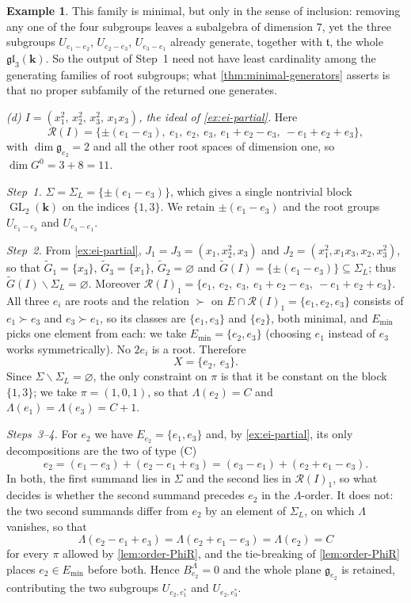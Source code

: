 \documentclass[11pt,letterpaper,reqno]{amsart}
\theoremstyle{remark}
\theoremstyle{definition}
\newtheorem{example}[example]{Example}
\newcommand{\KK}[0]{\ensuremath{\mathbf{k}}}
\newcommand{\GL}[0]{\ensuremath{\operatorname{GL}}}
\newcommand{\R}{\mathcal R}
\begin{document}
\begin{example}
This family is minimal, but only in the sense of inclusion: removing any one of the
four subgroups leaves a subalgebra of dimension $7$, yet the three subgroups
$U_{e_1-e_2}$, $U_{e_2-e_3}$, $U_{e_3-e_1}$ already generate, together with $\mathfrak t$, the whole
$\mathfrak{gl}_3(\KK)$. So the output of Step~1 need not have least cardinality among the
generating families of root subgroups; what \cref{thm:minimal-generators} asserts is that no
proper subfamily of the returned one generates.

\medskip\noindent\emph{(d) $I=(x_1^2,\,x_2^2,\,x_3^2,\,x_1x_3)$, the ideal of
\cref{ex:ei-partial}.} Here
\[\R(I)=\{\pm(e_1-e_3),\ e_1,\ e_2,\ e_3,\ e_1+e_2-e_3,\ -e_1+e_2+e_3\},\]
with $\dim\mathfrak g_{e_2}=2$ and all the other root spaces of dimension one, so
$\dim G^0=3+8=11$.

\emph{Step~1.} $\Sigma=\Sigma_L=\{\pm(e_1-e_3)\}$, which gives a single nontrivial block
$\GL_2(\KK)$ on the indices $\{1,3\}$. We retain $\pm(e_1-e_3)$ and the root groups
$U_{e_1-e_3}$ and $U_{e_3-e_1}$.

\emph{Step~2.} From \cref{ex:ei-partial}, $J_1=J_3=(x_1,x_2^2,x_3)$ and
$J_2=(x_1^2,x_1x_3,x_2,x_3^2)$, so that $\widetilde G_1=\{x_3\}$, $\widetilde G_3=\{x_1\}$,
$\widetilde G_2=\varnothing$ and $\widetilde G(I)=\{\pm(e_1-e_3)\}\subseteq\Sigma_L$; thus
$\widetilde G(I)\smallsetminus\Sigma_L=\varnothing$. Moreover
$\R(I)_1=\{e_1,\ e_2,\ e_3,\ e_1+e_2-e_3,\ -e_1+e_2+e_3\}$. All three $e_i$ are roots and the
relation $\succ$ on $E\cap\R(I)_1=\{e_1,e_2,e_3\}$ consists of $e_1\succ e_3$ and
$e_3\succ e_1$, so its classes are $\{e_1,e_3\}$ and $\{e_2\}$, both minimal, and
$E_{\mathrm{min}}$ picks one element from each: we take $E_{\mathrm{min}}=\{e_2,e_3\}$
(choosing $e_1$ instead of $e_3$ works symmetrically). No $2e_i$ is a root. Therefore
$$X=\{e_2,\ e_3\}.$$
Since $\Sigma\smallsetminus\Sigma_L=\varnothing$, the only constraint on $\pi$ is that it be
constant on the block $\{1,3\}$; we take $\pi=(1,0,1)$, so that $\Lambda(e_2)=C$ and
$\Lambda(e_1)=\Lambda(e_3)=C+1$.

\emph{Steps~3--4.} For $e_2$ we have $E_{e_2}=\{e_1,e_3\}$ and, by \cref{ex:ei-partial}, its
only decompositions are the two of type \textup{(C)}
$$e_2=(e_1-e_3)+(e_2-e_1+e_3)=(e_3-e_1)+(e_2+e_1-e_3).$$
In both, the first summand lies in $\Sigma$ and the second lies in $\R(I)_1$, so what decides
is whether the second summand precedes $e_2$ in the $\Lambda$-order. It does not: the two
second summands differ from $e_2$ by an element of $\Sigma_L$, on which $\Lambda$ vanishes, so
that
$$\Lambda(e_2-e_1+e_3)=\Lambda(e_2+e_1-e_3)=\Lambda(e_2)=C$$
for every $\pi$ allowed by \cref{lem:order-PhiR}, and the tie-breaking of
\cref{lem:order-PhiR} places $e_2\in E_{\mathrm{min}}$ before both. Hence
$B^{\Lambda}_{e_2}=0$ and the whole plane $\mathfrak g_{e_2}$ is retained, contributing the
two subgroups $U_{e_2,e_1^*}$ and $U_{e_2,e_3^*}$.


\end{example}
\end{document}
